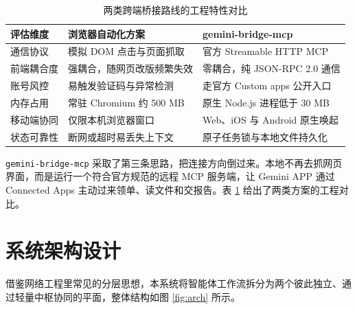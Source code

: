 \documentclass[10pt,a4paper,twocolumn]{article}
\begin{document}
\begin{table}[t]
\centering
\caption{两类跨端桥接路线的工程特性对比}
\label{tab:compare}
\scriptsize
\begin{tabularx}{\columnwidth}{@{}lXX@{}}
\toprule
\textbf{评估维度} & \textbf{浏览器自动化方案} & \textbf{gemini-bridge-mcp} \\
\midrule
通信协议 & 模拟 DOM 点击与页面抓取 & 官方 Streamable HTTP MCP \\
前端耦合度 & 强耦合，随网页改版频繁失效 & 零耦合，纯 JSON-RPC 2.0 通信 \\
账号风控 & 易触发验证码与异常检测 & 走官方 Custom apps 公开入口 \\
内存占用 & 常驻 Chromium 约 500 MB & 原生 Node.js 进程低于 30 MB \\
移动端协同 & 仅限本机浏览器窗口 & Web、iOS 与 Android 原生唤起 \\
状态可靠性 & 断网或超时易丢失上下文 & 原子任务锁与本地文件持久化 \\
\bottomrule
\end{tabularx}
\end{table}

\texttt{gemini-bridge-mcp} 采取了第三条思路，把连接方向倒过来。本地不再去抓网页界面，而是运行一个符合官方规范的远程 MCP 服务端，让 Gemini APP 通过 Connected Apps 主动过来领单、读文件和交报告。表 \ref{tab:compare} 给出了两类方案的工程对比。

\section{系统架构设计}

借鉴网络工程里常见的分层思想，本系统将智能体工作流拆分为两个彼此独立、通过轻量中枢协同的平面，整体结构如图 \ref{fig:arch} 所示。
\end{document}
